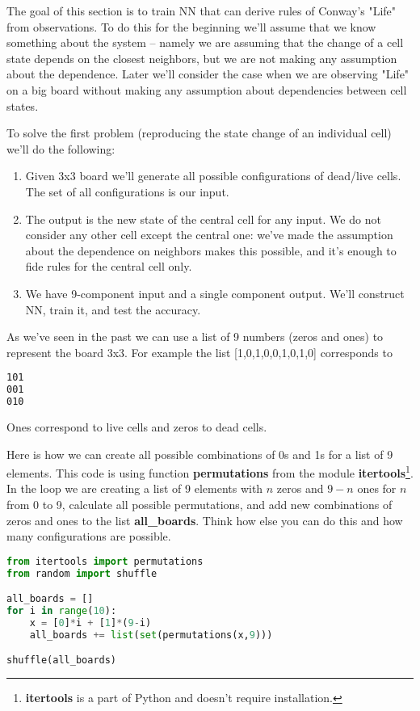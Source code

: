 The goal of this section is to train NN that can derive
rules of Conway's "Life" from observations. To do this
for the beginning we'll assume that we know something about
the system -- namely we are assuming that the change of a cell state
depends on the closest neighbors, but we are not making
any assumption about the dependence. Later we'll consider the case
when we are observing "Life" on a big board without making
any assumption about dependencies between cell states.

To solve the first problem (reproducing the state change
of an individual cell) we'll do the following:
\begin{enumerate}
\item Given 3x3 board we'll generate all possible configurations
of dead/live cells. The set of all configurations is our input.
\item The output is the new state of the central cell for any
input. We do not consider any other cell except the central one:
we've made the assumption about the dependence on neighbors makes
this possible, and it's enough to fide rules for the central cell
only.
\item We have 9-component input and a single component output.
We'll construct NN, train it, and test the accuracy.
\end{enumerate}

As we've seen in the past we can use a list of 9 numbers
(zeros and ones) to represent the board 3x3. For example
the list [1,0,1,0,0,1,0,1,0] corresponds to
\begin{lstlisting}[language=bash]
101
001
010
\end{lstlisting}
Ones correspond to live cells and zeros to dead cells.

Here is how we can create all possible combinations of 0s and 1s
for a list of 9 elements.
This code is using function \textbf{permutations} from the module
\textbf{itertools}\footnote{\textbf{itertools} is a part of Python and 
doesn't require installation.}. In the loop we are creating a list
of 9 elements with $n$ zeros and $9-n$ ones for $n$ from 0 to 9,
calculate all possible permutations, and add new combinations
of zeros and ones to the list \textbf{all\_boards}.
Think how else you can do this and how many configurations are possible.

\newpage

\begin{lstlisting}[language=Python,style=codelst2,caption={All 0-1 combinations on a board 3x3}]
from itertools import permutations
from random import shuffle

all_boards = []
for i in range(10):
    x = [0]*i + [1]*(9-i)
    all_boards += list(set(permutations(x,9)))

shuffle(all_boards)
\end{lstlisting}


